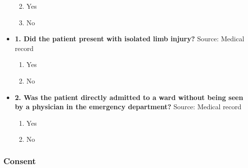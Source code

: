 \documentclass[
]{scrartcl}
\providecommand{\tightlist}{%
  \setlength{\itemsep}{0pt}\setlength{\parskip}{0pt}}\usepackage{longtable,booktabs,array}
\begin{document}
\begin{itemize}
  \begin{enumerate}
  \def\labelenumi{\arabic{enumi}.}
  \tightlist
  \item
    Yes
  \item
    No
  \end{enumerate}
\item
  \textbf{1. Did the patient present with isolated limb injury?} Source:
  Medical record

  \begin{enumerate}
  \def\labelenumi{\arabic{enumi}.}
  \tightlist
  \item
    Yes
  \item
    No
  \end{enumerate}
\item
  \textbf{2. Was the patient directly admitted to a ward without being
  seen by a physician in the emergency department?} Source: Medical
  record

  \begin{enumerate}
  \def\labelenumi{\arabic{enumi}.}
  \tightlist
  \item
    Yes
  \item
    No
  \end{enumerate}
\end{itemize}

\hypertarget{consent}{%
\subsubsection{Consent}\label{consent}}
\end{document}
